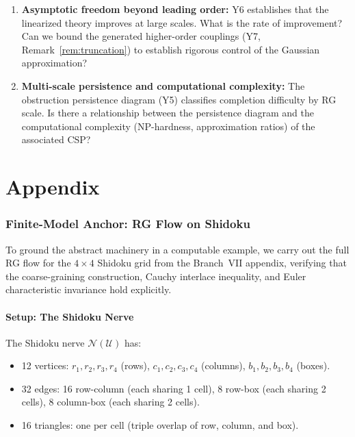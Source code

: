 \documentclass[11pt,letterpaper]{article}
\newcommand{\cover}{\mathcal{U}}
\newcommand{\nerve}{\mathcal{N}}
\begin{document}
\begin{enumerate}
    \item \textbf{Asymptotic freedom beyond leading order:} Y6 
    establishes that the linearized theory improves at large scales. 
    What is the rate of improvement? Can we bound the generated 
    higher-order couplings (Y7, Remark~\ref{rem:truncation}) to 
    establish rigorous control of the Gaussian approximation?
    
    \item \textbf{Multi-scale persistence and computational 
    complexity:} The obstruction persistence diagram (Y5) 
    classifies completion difficulty by RG scale. Is there a 
    relationship between the persistence diagram and the 
    computational complexity (NP-hardness, approximation ratios) 
    of the associated CSP?
\end{enumerate}

\newpage
\appendix
\part*{Appendix}

\section{Finite-Model Anchor: RG Flow on 
Shidoku}\label{app:shidoku_rg}

To ground the abstract machinery in a computable example, we carry 
out the full RG flow for the $4 \times 4$ Shidoku grid from the 
Branch~VII appendix, verifying that the coarse-graining 
construction, Cauchy interlace inequality, and Euler characteristic 
invariance hold explicitly.

\subsection{Setup: The Shidoku Nerve}

The Shidoku nerve $\nerve(\cover)$ has:
\begin{itemize}
    \item 12 vertices: $r_1, r_2, r_3, r_4$ (rows), 
    $c_1, c_2, c_3, c_4$ (columns), 
    $b_1, b_2, b_3, b_4$ (boxes).
    \item 32 edges: 16 row-column (each sharing 1 cell), 
    8 row-box (each sharing 2 cells), 8 column-box (each sharing 
    2 cells).
    \item 16 triangles: one per cell (triple overlap of row, 
    column, and box).
\end{itemize}
\end{document}
